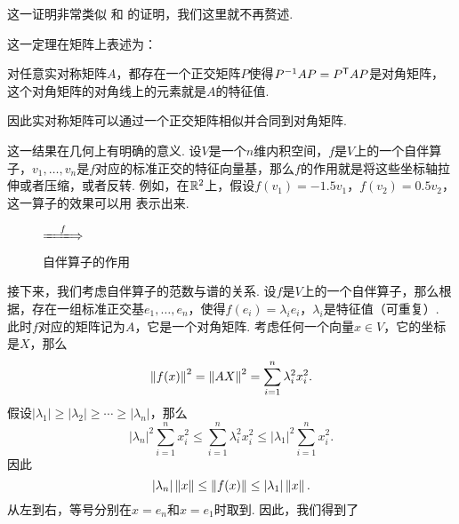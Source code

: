 这一证明非常类似 和 的证明，我们这里就不再赘述. 

这一定理在矩阵上表述为：
\begin{corollary}\label{cor:symmetric-matrix-spectrum}
对任意实对称矩阵$A$，都存在一个正交矩阵$P$使得$P^{-1}AP=P^{\mathsf{T}} AP$是对角矩阵，这个对角矩阵的对角线上的元素就是$A$的特征值. 
\end{corollary}

因此实对称矩阵可以通过一个正交矩阵相似并合同到对角矩阵. 

这一结果在几何上有明确的意义. 设$V$是一个$n$维内积空间，$f$是$V$上的一个自伴算子，$v_1,\dots,v_n$是$f$对应的标准正交的特征向量基，那么$f$的作用就是将这些坐标轴拉伸或者压缩，或者反转. 例如，在$\mathbb{R}^2$上，假设$f(v_1)=-1.5v_1$，$f(v_2)=0.5v_2$，这一算子的效果可以用 表示出来. 

\begin{figure}[ht]
\centering
\begin{minipage}[c]{0.3\linewidth}
\end{minipage}
$\xLongrightarrow{\quad f\quad}$
\begin{minipage}[c]{0.3\linewidth}
\end{minipage}
\caption{自伴算子的作用}
\label{fig:symmetric-operator}
\end{figure}

接下来，我们考虑自伴算子的范数与谱的关系. 设$f$是$V$上的一个自伴算子，那么根据，存在一组标准正交基$e_1,\dots,e_n$，使得$f(e_i)=\lambda_i e_i$，$\lambda_i$是特征值（可重复）. 此时$f$对应的矩阵记为$A$，它是一个对角矩阵. 考虑任何一个向量$x\in V$，它的坐标是$X$，那么
\[
    \left\|f(x)\right\|^2=\left\|AX\right\|^2=\sum_{i=1}^n\lambda_i^2x_i^2.
\]
假设$|\lambda_1|\geq|\lambda_2|\geq\cdots\geq|\lambda_n|$，那么
\[
    |\lambda_n|^2\sum_{i=1}^n x_i^2\leq \sum_{i=1}^n\lambda_i^2x_i^2\leq |\lambda_1|^2\sum_{i=1}^n x_i^2.
\]
因此
\[
    |\lambda_n|\left\|x\right\|\leq \left\|f(x)\right\|\leq |\lambda_1|\left\|x\right\|.
\]
从左到右，等号分别在$x=e_n$和$x=e_1$时取到. 因此，我们得到了

